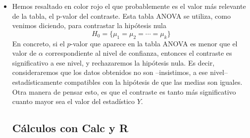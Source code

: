 \begin{itemize}    
    \item Hemos resaltado en color rojo el que probablemente es el valor más relevante de la tabla, el p-valor del contraste.  Esta tabla ANOVA se utiliza, como venimos diciendo, para contrastar la hipótesis nula
    \[H_0=\{\mu_1=\mu_2=\cdots=\mu_k\}\]
    En concreto, si el $p$-valor que aparece en la tabla ANOVA  es menor que el valor de $\alpha$ correspondiente al nivel de confianza, entonces el contraste es {\sf significativo} a ese nivel, y rechazaremos la hipótesis nula. Es decir, consideraremos que los datos obtenidos no son --insistimos, a ese nivel-- estadísticamente compatibles con la hipótesis de que las medias son iguales. Otra manera de pensar esto, es que el contraste es tanto más significativo cuanto mayor sea el valor del estadístico $Y$.


\subsection{Cálculos con Calc y R}


\end{itemize}
